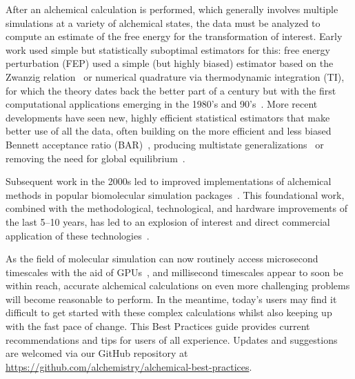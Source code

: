 \documentclass[9pt,bestpractices]{livecoms}
\begin{document}
After an alchemical calculation is performed, which generally involves multiple simulations at a variety of alchemical states, the data must be analyzed to compute an estimate of the free energy for the transformation of interest.
 Early work used simple but statistically suboptimal estimators for this: free energy perturbation (FEP) used a simple (but highly biased) estimator based on the Zwanzig relation~\cite{zwanzig1954hightemperature} or numerical quadrature via thermodynamic integration (TI), for which the theory dates back the better part of a century but with the first computational applications emerging in the 1980's and 90's~\cite{kirkwood1935statistical, jorgensen1985monte, kollman1993free, wong1986dynamics, merz1989free}. %
 More recent developments have seen new, highly efficient statistical estimators that make better use of all the data, often building on the more efficient and less biased Bennett acceptance ratio (BAR)~\cite{bennett1976efficient}, producing multistate generalizations~\cite{shirts2008statisticallya} or removing the need for global equilibrium~\cite{wu2016multiensemble, mey2014xtram, wu2014statistically}.

Subsequent work in the 2000s led to improved implementations of alchemical methods in popular biomolecular simulation packages~\cite{shirts2003extremely,shirts2005solvation,vanderspoel2005gromacs, mermelstein2018fast, wang2015accurate, hedges2019biosimspace, riniker2011calculation}. 
 This foundational work, combined with the methodological, technological, and hardware improvements of the last 5--10 years, has led to an explosion of interest and direct commercial application of these technologies~\cite{wang2015accurate, fratev2019improved, schindler2020largescale, cournia2017relative, sherborne2016collaborating, kuhn2020assessment}.


As the field of molecular simulation can now routinely access microsecond timescales with the aid of GPUs~\cite{salomon-ferrer2013routine}, and millisecond timescales appear to soon be within reach, accurate alchemical calculations on even more challenging problems will become reasonable to perform. 
In the meantime, today's users may find it difficult to get started with these complex calculations whilst also keeping up with the fast pace of change. 
This Best Practices guide provides current recommendations and tips for users of all experience. Updates and suggestions are welcomed via our GitHub repository at \url{https://github.com/alchemistry/alchemical-best-practices}.    
\end{document}
